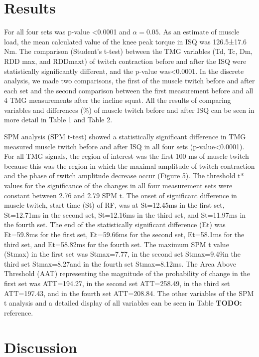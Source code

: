 \documentclass[utf8]{style/FrontiersinHarvard}
\newcommand{\TODO}[1]{{\textbf{TODO:} {\color{red} #1}}}
\begin{document}
\section{Results}
For all four sets was p-value <0.0001 and $ \alpha = 0.05 $.
As an estimate of muscle load, the mean calculated value of the knee peak torque in ISQ was 126.5±17.6 Nm.
The comparison (Student's t-test) between the TMG variables (Td, Tc, Dm, RDD max, and RDDmaxt) of twitch contraction before and after the ISQ were statistically significantly different, and the p-value was<0.0001.
In the discrete analysis, we made two comparisons, the first of the muscle twitch before and after each set and the second comparison between the first measurement before and all 4 TMG measurements after the incline squat.
All the results of comparing variables and differences (\%) of muscle twitch before and after ISQ can be seen in more detail in Table 1 and Table 2.


SPM analysis (SPM t-test) showed a statistically significant difference in TMG measured muscle twitch before and after ISQ in all four sets (p-value<0.0001).
For all TMG signals, the region of interest was the first 100 ms of muscle twitch because this was the region in which the maximal amplitude of twitch contraction and the phase of twitch amplitude decrease occur (Figure 5).
The threshold t* values for the significance of the changes in all four measurement sets were constant between 2.76 and 2.79 SPM t.
The onset of significant difference in muscle twitch, start time (St) of RF, was at St=12.45ms in the first set, St=12.71ms in the second set, St=12.16ms in the third set, and St=11.97ms in the fourth set.
The end of the statistically significant difference (Et) was Et=59.8ms for the first set, Et=59.66ms for the second set, Et=58.1ms for the third set, and Et=58.82ms for the fourth set.
The maximum SPM t value (Stmax) in the first set was Stmax=7.77, in the second set Stmax=9.49in the third set Stmax=8.27and in the fourth set Stmax=8.12ms.
The Area Above Threshold (AAT) representing the magnitude of the probability of change in the first set was ATT=194.27, in the second set ATT=258.49, in the third set ATT=197.43, and in the fourth set ATT=208.84.
The other variables of the SPM t analysis and a detailed display of all variables can be seen in Table \TODO{reference}.


\section{Discussion}
\end{document}
